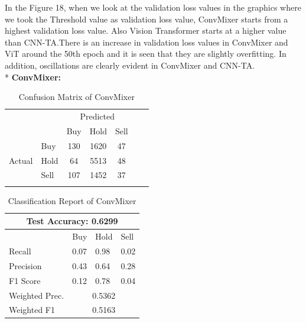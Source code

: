 \documentclass[]{article}
\begin{document}
\noindent
In the Figure 18, when we look at the validation loss values in the graphics where we took the Threshold value as validation loss value, ConvMixer starts from a highest validation loss value. Also Vision Transformer starts at a higher value than CNN-TA.There is an increase in validation loss values in ConvMixer and ViT around the 50th epoch and it is seen that they are slightly overfitting. In addition, oscillations are clearly evident in ConvMixer and CNN-TA. \vspace{0.2cm} \\* 
\textbf{ConvMixer:}
\begin{table}[H]
    \centering
    \caption{Confusion Matrix of ConvMixer}
    \begin{tabular}{llcccll}
        \cline{1-5}
        \multicolumn{1}{|l|}{} & \multicolumn{1}{l|}{} & \multicolumn{3}{c|}{Predicted} & & \\\cline{1-5} \multicolumn{1}{|l|}{} & \multicolumn{1}{l|}{} & \multicolumn{1}{l|}{Buy} & \multicolumn{1}{l|}{Hold} & \multicolumn{1}{l|}{Sell} & & \\ \cline{1-5} \multicolumn{1}{|c|}{\multirow{3}{*}{Actual}} & \multicolumn{1}{l|}{Buy} & \multicolumn{1}{c|}{130} & \multicolumn{1}{c|}{1620} & \multicolumn{1}{c|}{47} & & \\ \cline{2-5} \multicolumn{1}{|c|}{} & \multicolumn{1}{l|}{Hold} & \multicolumn{1}{c|}{64} & \multicolumn{1}{c|}{5513}  & \multicolumn{1}{c|}{48}& & \\ \cline{2-5} \multicolumn{1}{|c|}{} & \multicolumn{1}{l|}{Sell} & \multicolumn{1}{c|}{107} & \multicolumn{1}{c|}{1452} & \multicolumn{1}{c|}{37} & & \\ \cline{1-5} & & \multicolumn{1}{l}{} & \multicolumn{1}{l}{} & \multicolumn{1}{l}{} &&
    \end{tabular}
\end{table}

\begin{table}[H]
\centering
\caption{Classification Report of ConvMixer}
\begin{tabular}{|llll|}
\hline
\multicolumn{4}{|c|}{\textbf{Test Accuracy: 0.6299}}                                                         \\ \hline
\multicolumn{1}{|l|}{}               & \multicolumn{1}{l|}{Buy}  & \multicolumn{1}{l|}{Hold} & Sell \\ \hline
\multicolumn{1}{|l|}{Recall}         & \multicolumn{1}{l|}{0.07} & \multicolumn{1}{l|}{0.98} & 0.02 \\ \hline
\multicolumn{1}{|l|}{Precision}      & \multicolumn{1}{l|}{0.43} & \multicolumn{1}{l|}{0.64} & 0.28 \\ \hline
\multicolumn{1}{|l|}{F1 Score}       & \multicolumn{1}{l|}{0.12} & \multicolumn{1}{l|}{0.78} & 0.04 \\ \hline
\multicolumn{1}{|l|}{Weighted Prec.} & \multicolumn{3}{c|}{0.5362}                                  \\ \hline
\multicolumn{1}{|l|}{Weighted F1}    & \multicolumn{3}{c|}{0.5163}                                  \\ \hline
\end{tabular}
\end{table}
\end{document}
